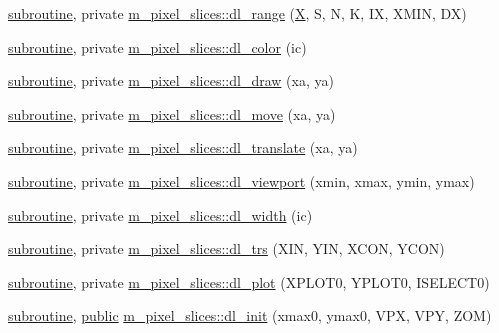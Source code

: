 \begin{DoxyCompactItemize}
\item 
\hyperlink{M__stopwatch_83_8txt_acfbcff50169d691ff02d4a123ed70482}{subroutine}, private \hyperlink{namespacem__pixel__slices_a47408b6c6411a3c3cb3419b319e57978}{m\+\_\+pixel\+\_\+slices\+::dl\+\_\+range} (\hyperlink{intro__blas1_83_8txt_ac8596739bc875e90fe6e2ecf98e87906}{X}, S, N, K, IX, X\+M\+IN, DX)
\item 
\hyperlink{M__stopwatch_83_8txt_acfbcff50169d691ff02d4a123ed70482}{subroutine}, private \hyperlink{namespacem__pixel__slices_a8e362bf8eea80faddc97f7d137c95f9c}{m\+\_\+pixel\+\_\+slices\+::dl\+\_\+color} (ic)
\item 
\hyperlink{M__stopwatch_83_8txt_acfbcff50169d691ff02d4a123ed70482}{subroutine}, private \hyperlink{namespacem__pixel__slices_acafdf0174290a0e231ca120f6305b5d0}{m\+\_\+pixel\+\_\+slices\+::dl\+\_\+draw} (xa, ya)
\item 
\hyperlink{M__stopwatch_83_8txt_acfbcff50169d691ff02d4a123ed70482}{subroutine}, private \hyperlink{namespacem__pixel__slices_ab9e9530d7fb4fbea1bc5d52744498731}{m\+\_\+pixel\+\_\+slices\+::dl\+\_\+move} (xa, ya)
\item 
\hyperlink{M__stopwatch_83_8txt_acfbcff50169d691ff02d4a123ed70482}{subroutine}, private \hyperlink{namespacem__pixel__slices_ad35fa14bd29e8e895f22de6500b6b5ff}{m\+\_\+pixel\+\_\+slices\+::dl\+\_\+translate} (xa, ya)
\item 
\hyperlink{M__stopwatch_83_8txt_acfbcff50169d691ff02d4a123ed70482}{subroutine}, private \hyperlink{namespacem__pixel__slices_a87a664883c6c5e0e2812df4d1ea29515}{m\+\_\+pixel\+\_\+slices\+::dl\+\_\+viewport} (xmin, xmax, ymin, ymax)
\item 
\hyperlink{M__stopwatch_83_8txt_acfbcff50169d691ff02d4a123ed70482}{subroutine}, private \hyperlink{namespacem__pixel__slices_a2a4bb6da0ae36c65fdf05996e3ae5487}{m\+\_\+pixel\+\_\+slices\+::dl\+\_\+width} (ic)
\item 
\hyperlink{M__stopwatch_83_8txt_acfbcff50169d691ff02d4a123ed70482}{subroutine}, private \hyperlink{namespacem__pixel__slices_a141b4da9ce5a0d633cc488f656c0320d}{m\+\_\+pixel\+\_\+slices\+::dl\+\_\+trs} (X\+IN, Y\+IN, X\+C\+ON, Y\+C\+ON)
\item 
\hyperlink{M__stopwatch_83_8txt_acfbcff50169d691ff02d4a123ed70482}{subroutine}, private \hyperlink{namespacem__pixel__slices_aa70737b5f5945b2f513163ee5c40942d}{m\+\_\+pixel\+\_\+slices\+::dl\+\_\+plot} (X\+P\+L\+O\+T0, Y\+P\+L\+O\+T0, I\+S\+E\+L\+E\+C\+T0)
\item 
\hyperlink{M__stopwatch_83_8txt_acfbcff50169d691ff02d4a123ed70482}{subroutine}, \hyperlink{M__stopwatch_83_8txt_a2f74811300c361e53b430611a7d1769f}{public} \hyperlink{namespacem__pixel__slices_a4ac8bc6e1f869e60a675611420fee0f7}{m\+\_\+pixel\+\_\+slices\+::dl\+\_\+init} (xmax0, ymax0, V\+PX, V\+PY, Z\+OM)

\end{DoxyCompactItemize}
